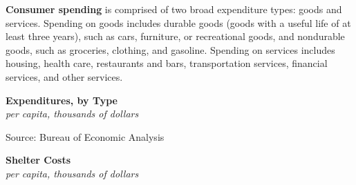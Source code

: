 \documentclass{report}
\makeatletter
\newcommand{\tbllink}[1]{\href{https://raw.githubusercontent.com/bdecon/US-chartbook/master/chartbook/data/#1}{\faTable}}
\newcommand*\short[1]{\expandafter\@gobbletwo\number\numexpr#1\relax}
\newcommand{\stdnode}[3]{\node[below, align=left, shift=({#1,#2})]{#3};}
\newcommand{\shdateaxisticks}{
		date coordinates in=x, axis line style={draw=none},
		xmax={2023-11-01},
		max space between ticks=40,	    
		xtick={{1990-01-01}, {1995-01-01}, {2000-01-01}, 
			{2005-01-01}, {2010-01-01}, {2015-01-01}, {2020-01-01}},
		minor xtick={},
		enlarge y limits={0.06}, enlarge x limits={0.01},
		}
\newcommand{\bbar}[2]{extra #1 ticks = {{#2}}, extra #1 tick labels = ,
		extra #1 tick style = {grid=major, grid style={thick, black!25}},}
\newcommand{\stdline}[4]{\addplot[very thick, no markers, color=#1] 
		table [x=#2, y=#3, col sep=comma] {#4};	}
\newcommand{\rbars}{
		\fill[color=black!10] (axis cs:{1990-07-01},\pgfkeysvalueof{/pgfplots/ymin}) rectangle 
			(axis cs:{1991-03-01}, \pgfkeysvalueof{/pgfplots/ymax});
		\fill[color=black!10] (axis cs:{2007-12-01},\pgfkeysvalueof{/pgfplots/ymin}) rectangle 
			(axis cs:{2009-07-01}, \pgfkeysvalueof{/pgfplots/ymax});
		\fill[color=black!10] (axis cs:{2001-03-01},\pgfkeysvalueof{/pgfplots/ymin}) rectangle 
			(axis cs:{2001-11-01}, \pgfkeysvalueof{/pgfplots/ymax});
		\fill[color=black!10] (axis cs:{2020-02-01},\pgfkeysvalueof{/pgfplots/ymin}) rectangle 
			(axis cs:{2020-05-01}, \pgfkeysvalueof{/pgfplots/ymax});}
\makeatother
\begin{document}
{\begin{minipage}{0.76\textwidth}
\small \textbf{Consumer spending} is comprised of two broad expenditure types: goods and services. Spending on goods includes durable goods (goods with a useful life of at least three years), such as cars, furniture, or recreational goods, and nondurable goods, such as groceries, clothing, and gasoline. Spending on services includes housing, health care, restaurants and bars, transportation services, financial services, and other services. 
\end{minipage}

\begin{minipage}{0.38\textwidth}
\normalsize \textbf{Expenditures, by Type}\\
\footnotesize{\textit{per capita, thousands of dollars}}
\vspace{3.1cm}

\hspace{3mm} 

\footnotesize{Source: Bureau of Economic Analysis} \hspace{10mm} \tbllink{pce_levels.csv}
\end{minipage} \hspace{6mm}
\begin{minipage}{0.33\textwidth}
\small 
\end{minipage}
\vspace{1mm}

\begin{minipage}{0.38\textwidth}
\normalsize \textbf{Shelter Costs}\\
\footnotesize{\textit{per capita, thousands of dollars}}
\vspace{3.1cm}


\end{minipage}}
\end{document}
